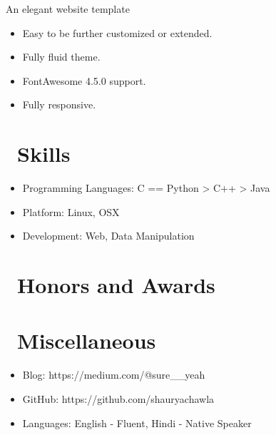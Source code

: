 \documentclass{resume}
\begin{document}
An elegant website template
\begin{itemize}
  \item Easy to be further customized or extended.
  \item Fully fluid theme.
  \item FontAwesome 4.5.0 support.
  \item Fully responsive.

\end{itemize}


\section{\faCogs\ Skills}
\begin{itemize}[parsep=0.5ex]
  \item Programming Languages: C == Python > C++ > Java
  \item Platform: Linux, OSX
  \item Development: Web, Data Manipulation
\end{itemize}

\section{\faHeartO\ Honors and Awards}

\section{\faInfo\ Miscellaneous}
\begin{itemize}[parsep=0.5ex]
  \item Blog: https://medium.com/@sure\_\_yeah
  \item GitHub: https://github.com/shauryachawla
  \item Languages: English - Fluent, Hindi - Native Speaker
\end{itemize}

%
%
\end{document}
